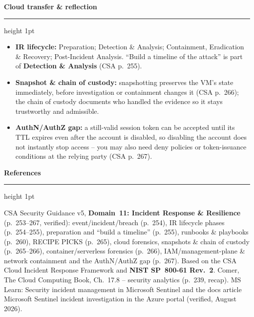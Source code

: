 \documentclass[11pt]{article}
\newcommand{\wbsection}[1]{\par\vspace{11pt}\noindent
  {\large\bfseries\color{kred}#1}\par\vspace{2pt}
  {\color{kred!35}\hrule height 1pt}\par\vspace{6pt}}
\renewcommand{\emph}[1]{\textup{#1}}
\begin{document}
\wbsection{Cloud transfer \& reflection}
\begin{itemize}
\item \textbf{IR lifecycle:} Preparation; Detection \& Analysis; Containment, Eradication \& Recovery;
      Post-Incident Analysis. ``Build a timeline of the attack'' is part of \textbf{Detection \&
      Analysis} (CSA p.~255).
\item \textbf{Snapshot \& chain of custody:} snapshotting preserves the VM's state immediately, before
      investigation or containment changes it (CSA p.~266); the chain of custody documents who handled
      the evidence so it stays trustworthy and admissible.
\item \textbf{AuthN/AuthZ gap:} a still-valid session token can be accepted until its TTL expires even
      after the account is disabled, so disabling the account does not instantly stop access -- you may
      also need deny policies or token-issuance conditions at the relying party (CSA p.~267).
\end{itemize}

\wbsection{References}
CSA Security Guidance v5, \textbf{Domain~11: Incident Response \& Resilience} (p.~253--267, verified):
event/incident/breach (p.~254), IR lifecycle phases (p.~254--255), preparation and ``build a timeline''
(p.~255), runbooks \& playbooks (p.~260), RECIPE PICKS (p.~265), cloud forensics, snapshots \& chain of
custody (p.~265--266), container/serverless forensics (p.~266), IAM/management-plane \& network
containment and the AuthN/AuthZ gap (p.~267). Based on the CSA Cloud Incident Response Framework and
\textbf{NIST SP~800-61 Rev.~2}. Comer, \emph{The Cloud Computing Book}, Ch.~17.8 -- security analytics
(p.~239, recap). MS Learn: \emph{Security incident management in Microsoft Sentinel} and the docs
article \emph{Microsoft Sentinel incident investigation in the Azure portal} (verified, August 2026).
\end{document}
